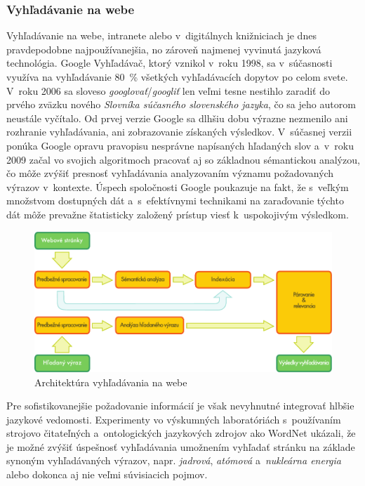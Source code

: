 \begin{multicols}{2}
\subsubsection{Vyhľadávanie na webe}
Vyhľadávanie na webe, intranete alebo v~digitálnych knižniciach je dnes pravdepodobne najpoužívanejšia, no zároveň najmenej vyvinutá jazyková technológia. Google Vyhľadávač, ktorý vznikol v~roku 1998, sa v~súčasnosti využíva na vyhľadávanie 80~\% všetkých vyhľadávacích dopytov po celom svete. V~roku 2006 sa sloveso \emph{googlovať}/\emph{googliť} len veľmi tesne nestihlo zaradiť do prvého zväzku nového \emph{Slovníka súčasného slovenského jazyka}, čo sa jeho autorom neustále vyčítalo. Od prvej verzie Google sa dlhšiu dobu výrazne nezmenilo ani rozhranie vyhľadávania, ani zobrazovanie získaných výsledkov. V~súčasnej verzii ponúka Google opravu pravopisu nesprávne napísaných hľadaných slov a~v~roku 2009 začal vo svojich algoritmoch pracovať aj so základnou sémantickou analýzou\cite{pc1}, čo môže zvýšiť presnosť vyhľadávania analyzovaním významu požadovaných výrazov v~kontexte. Úspech spoločnosti Google poukazuje na fakt, že s~veľkým množstvom dostupných dát a~s~efektívnymi technikami na zaraďovanie týchto dát môže prevažne štatisticky založený prístup viesť k~uspokojivým výsledkom.

\begin{figure}[htb]
  \center
  \includegraphics[width=\textwidth]{../_media/slovak/web_search_architecture}
  \caption{Architektúra vyhľadávania na webe}
  \label{fig:websearcharch_sk}
\end{figure}

Pre sofistikovanejšie požadovanie informácií je však nevyhnutné integrovať hlbšie jazykové vedomosti. Experimenty vo výskumných laboratóriách s~používaním strojovo čitateľných  a~ontologických jazykových zdrojov ako WordNet ukázali, že je možné zvýšiť úspešnosť vyhľadávania umožnením vyhľadať stránku na základe synoným vyhľadávaných výrazov, napr. \emph{jadrová}, \emph{atómová} a~\emph{nukleárna energia} alebo dokonca aj nie veľmi súvisiacich pojmov. 


\end{multicols}
